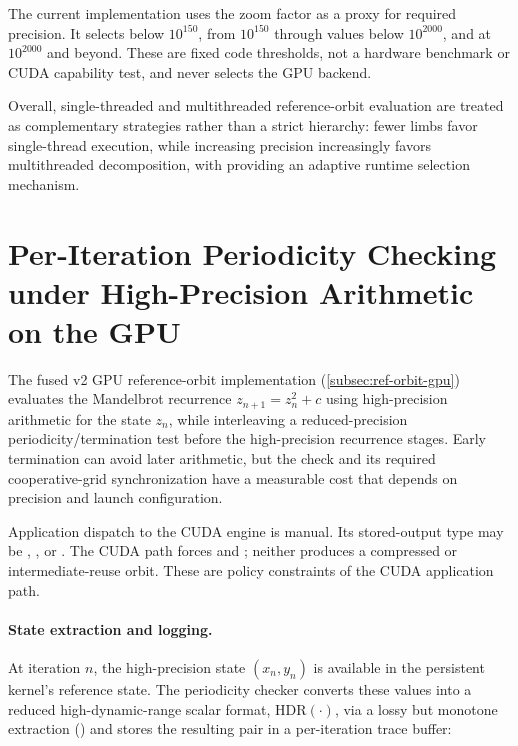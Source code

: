 The current  implementation uses the zoom factor as a proxy for
required precision.  It selects  below $10^{150}$,
 from $10^{150}$ through values below $10^{2000}$, and
 at $10^{2000}$ and beyond.  These are
fixed code thresholds, not a hardware benchmark or CUDA capability test, and
 never selects the GPU backend.

Overall, single-threaded and multithreaded reference-orbit evaluation are
treated as complementary strategies rather than a strict hierarchy: fewer limbs
favor single-thread execution, while increasing precision increasingly favors
multithreaded decomposition, with  providing an adaptive runtime
selection mechanism.


\section{Per-Iteration Periodicity Checking under High-Precision Arithmetic on the GPU}
\label{sec:hp-periodicity}

The \FractalShark{} fused v2 GPU reference-orbit implementation
(\cref{subsec:ref-orbit-gpu}) evaluates the Mandelbrot recurrence
\(
z_{n+1} = z_n^2 + c
\)
using high-precision arithmetic for the state \(z_n\), while interleaving a
reduced-precision periodicity/termination test before the high-precision
recurrence stages.  Early termination can avoid later arithmetic, but the
check and its required cooperative-grid synchronization have a measurable cost
that depends on precision and launch configuration.

Application dispatch to the CUDA engine is manual.  Its stored-output type  may be
, , or
.  The CUDA path forces
 and ; neither produces
a compressed or intermediate-reuse orbit.  These are policy constraints of the
CUDA application path.

\paragraph{State extraction and logging.}

At iteration \(n\), the high-precision state \((x_n, y_n)\) is available in the
persistent kernel's reference state. The periodicity checker converts
these values into a reduced high-dynamic-range scalar format,
\(\mathrm{HDR}(\cdot)\), via a lossy but monotone extraction
() and stores the resulting pair in a per-iteration trace
buffer:

